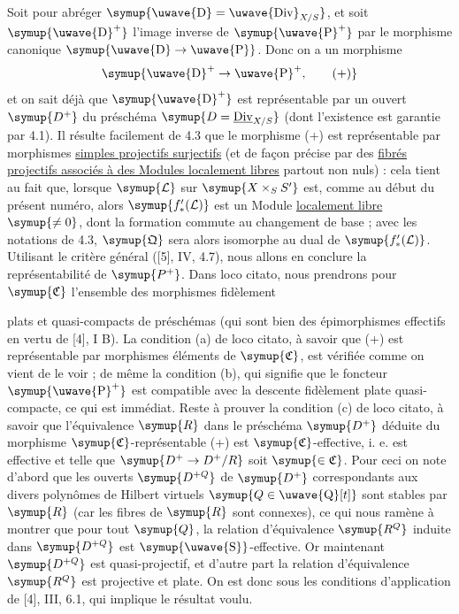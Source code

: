 Soit pour abréger $\symup{\text{\uwave{D}}=\text{\uwave{Div}}_{X/S}}$, et soit $\symup{\text{\uwave{D}}^+}$ l'image inverse
de $\symup{\text{\uwave{P}}^+}$ par le morphisme canonique $\symup{\text{\uwave{D}}\to\text{\uwave{P}}}$. Donc on a un
morphisme
\begin{equation}
\symup{\text{\uwave{D}}^+\to\text{\uwave{P}}^+,
\tag{+}}
\end{equation}
et on sait déjà que $\symup{\text{\uwave{D}}^+}$ est représentable par un ouvert $\symup{D^+}$ du préschéma
$\symup{D=\underline{\operatorname{Div}}_{X/S}}$ (dont l'existence est garantie par 4.1). Il
résulte facilement de 4.3 que le morphisme (+) est représentable par morphismes
\uline{simples projectifs surjectifs} (et de façon précise par des \uline{fibrés projectifs
associés à des Modules localement libres} partout non nuls) : cela tient au fait
que, lorsque $\symup{\mathcal L}$ sur $\symup{X\times_SS'}$ est, comme au début du présent
numéro, alors $\symup{f'_*(\mathcal L)}$ est un Module \uline{localement libre} $\symup{\neq0}$, dont la
formation commute au changement de base ; avec les notations de 4.3,
$\symup{\mathfrak Q}$ sera alors isomorphe au dual de $\symup{f'_*(\mathcal L)}$. Utilisant le
critère général ([5], IV, 4.7), nous allons en conclure la représentabilité de
$\symup{P^+}$. Dans loco citato, nous prendrons pour $\symup{\mathfrak C}$ l'ensemble des
morphismes fidèlement

plats et quasi-compacts de préschémas (qui sont bien des épimorphismes
effectifs en vertu de [4], I B). La condition (a) de loco citato, à savoir que
(+) est représentable par morphismes éléments de $\symup{\mathfrak C}$, est vérifiée
comme on vient de le voir ; de même la condition (b), qui signifie que le
foncteur $\symup{\text{\uwave{P}}^+}$ est compatible avec la descente fidèlement plate
quasi-compacte, ce qui est immédiat. Reste à prouver la condition (c) de loco
citato, à savoir que l'équivalence $\symup{R}$ dans le préschéma $\symup{D^+}$ déduite du
morphisme $\symup{\mathfrak C}$-représentable (+) est $\symup{\mathfrak C}$-effective, i. e. est
effective et telle que $\symup{D^+\to D^+/R}$ soit $\symup{\in\mathfrak C}$.
Pour ceci on note d'abord que les ouverts $\symup{D^{+Q}}$ de $\symup{D^+}$ correspondants aux
divers polynômes de Hilbert virtuels $\symup{Q\in\text{\uwave{Q}}[t]}$ sont stables par $\symup{R}$
(car les fibres de $\symup{R}$ sont connexes), ce qui nous ramène à montrer que pour
tout $\symup{Q}$, la relation d'équivalence $\symup{R^Q}$ induite dans $\symup{D^{+Q}}$ est
$\symup{\text{\uwave{S}}}$-effective. Or maintenant $\symup{D^{+Q}}$ est quasi-projectif, et d'autre
part la relation d'équivalence $\symup{R^Q}$ est projective et plate. On est donc sous
les conditions d'application de [4], III, 6.1, qui implique le résultat voulu.

